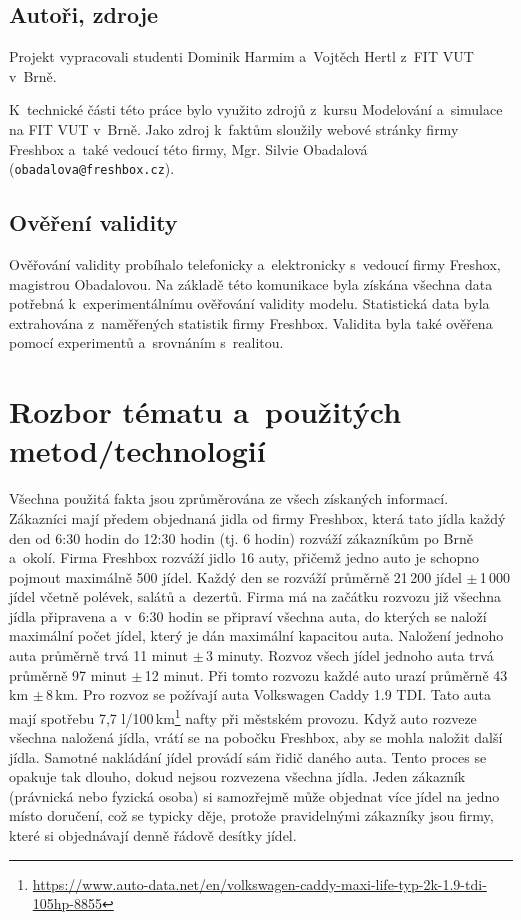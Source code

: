 \documentclass[a4paper, 11pt]{article}
\begin{document}
	\subsection{Autoři, zdroje}

	Projekt vypracovali studenti Dominik Harmim a~Vojtěch Hertl z~FIT VUT
	v~Brně.

	K~technické části této práce bylo využito zdrojů z~kursu Modelování
	a~simulace na FIT VUT v~Brně. Jako zdroj k~faktům sloužily webové stránky
	firmy Freshbox a~také vedoucí této firmy, Mgr. Silvie Obadalová \\
	(\texttt{obadalova@freshbox.cz}).


	\subsection{Ověření validity}

	Ověřování validity \cite[snímek 37]{IMS_slides} probíhalo telefonicky
	a~elektronicky s~vedoucí firmy Freshox, magistrou Obadalovou. Na základě
	této komunikace byla získána všechna data potřebná k~experimentálnímu
	ověřování validity modelu. Statistická data byla extrahována z~naměřených
	statistik firmy Freshbox. Validita byla také ověřena pomocí experimentů
	a~srovnáním s~realitou.



	\section{Rozbor tématu a~použitých metod/technologií}

	Všechna použitá fakta jsou zprůměrována ze všech získaných informací. \\

	Zákazníci mají předem objednaná jidla od firmy Freshbox, která tato jídla
	každý den od 6:30 hodin do 12:30 hodin (tj. 6 hodin) rozváží zákazníkům po
	Brně a~okolí. Firma Freshbox rozváží jidlo 16 auty, přičemž jedno auto
	je schopno pojmout maximálně 500 jídel. Každý den se rozváží
	průměrně 21\,200 jídel $\pm$\,1\,000 jídel včetně polévek, salátů
	a~dezertů. Firma má na začátku rozvozu již všechna jídla připravena
	a~v~6:30 hodin se připraví všechna auta, do kterých se naloží maximální
	počet jídel, který je dán maximální kapacitou auta. Naložení jednoho auta
	průměrně trvá 11 minut $\pm$\,3 minuty. Rozvoz všech jídel jednoho auta
	trvá průměrně 97 minut $\pm$\,12 minut. Při tomto rozvozu každé auto urazí
	průměrně 43\,km $\pm$\,8\,km. Pro rozvoz se požívají auta Volkswagen Caddy
	1.9 TDI. Tato auta mají spotřebu 7,7 l/100\,km\footnote{
		\url{https://www.auto-data.net/en/volkswagen-caddy-maxi-life-typ-2k-1.9-tdi-105hp-8855}
	} nafty při městském provozu. Když auto rozveze všechna naložená jídla,
	vrátí se na pobočku Freshbox, aby se mohla naložit další jídla. Samotné
	nakládání jídel provádí sám řidič daného auta. Tento proces se opakuje
	tak dlouho, dokud nejsou rozvezena všechna jídla. Jeden zákazník
	(právnická nebo fyzická osoba) si samozřejmě může objednat více jídel na
	jedno místo doručení, což se typicky děje, protože pravidelnými zákazníky
	jsou firmy, které si objednávají denně řádově desítky jídel.
\end{document}
